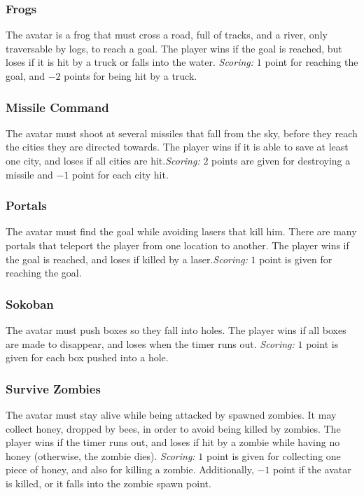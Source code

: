 \documentclass[conference]{IEEEtran}
\begin{document}
\subsubsection{Frogs} The avatar is a frog that must cross a road, full of tracks, and a river, only traversable by logs, to reach a goal.  The player wins if the goal is reached, but loses if it is hit by a truck or falls into the water. \textit{Scoring:}  $1$ point for reaching the goal, and $-2$ points for being hit by a truck.

\subsubsection{Missile Command} The avatar must shoot at several missiles that fall from the sky, before they reach the cities they are directed towards. The player wins if it is able to save at least one city, and loses if all cities are hit.\textit{Scoring:} $2$ points are given for destroying a missile and $-1$ point for each city hit.

\subsubsection{Portals} The avatar must find the goal while avoiding lasers that kill him. There are many portals that teleport the player from one location to another. The player wins if the goal is reached, and loses if killed by a laser.\textit{Scoring:} $1$ point is given for reaching the goal. 

\subsubsection{Sokoban} The avatar must push boxes so they fall into holes. The player wins if all boxes are made to disappear, and loses when the timer runs out. \textit{Scoring:} $1$ point is given for each box pushed into a hole. 

\subsubsection{Survive Zombies} The avatar must stay alive while being attacked by spawned zombies. It may collect honey, dropped by bees, in order to avoid being killed by zombies. The player wins if the timer runs out, and loses if hit by a zombie while having no honey (otherwise, the zombie dies). \textit{Scoring:} $1$ point is given for collecting one piece of honey, and also for killing a zombie. Additionally, $-1$ point if the avatar is killed, or it falls into the zombie spawn point.
\end{document}
